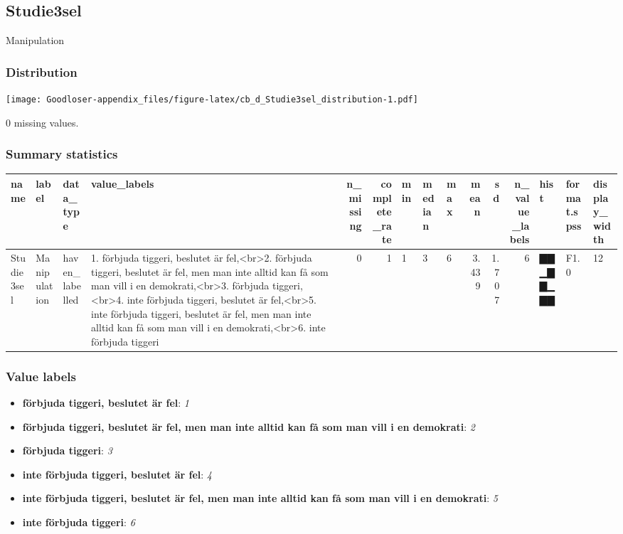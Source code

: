 \documentclass[
]{book}
\providecommand{\tightlist}{%
  \setlength{\itemsep}{0pt}\setlength{\parskip}{0pt}}
\begin{document}
\hypertarget{Studie3sel}{%
\subsection{Studie3sel}\label{Studie3sel}}

Manipulation

\hypertarget{Studie3sel_distribution}{%
\subsubsection{Distribution}\label{Studie3sel_distribution}}

\texttt{[image: Goodloser-appendix\_files/figure-latex/cb\_d\_Studie3sel\_distribution-1.pdf]}

0 missing values.

\hypertarget{Studie3sel_summary}{%
\subsubsection{Summary statistics}\label{Studie3sel_summary}}

\begin{tabular}{l|l|l|l|r|r|l|l|l|r|r|r|l|l|l}
\hline
name & label & data_type & value_labels & n_missing & complete_rate & min & median & max & mean & sd & n_value_labels & hist & format.spss & display_width\\
\hline
Studie3sel & Manipulation & haven_labelled & 1. förbjuda tiggeri, beslutet är fel,<br>2. förbjuda tiggeri, beslutet är fel, men man inte alltid kan få som man vill i en demokrati,<br>3. förbjuda tiggeri,<br>4. inte förbjuda tiggeri, beslutet är fel,<br>5. inte förbjuda tiggeri, beslutet är fel, men man inte alltid kan få som man vill i en demokrati,<br>6. inte förbjuda tiggeri & 0 & 1 & 1 & 3 & 6 & 3.439 & 1.707 & 6 & ▇▇▁▇▇▁▇▇ & F1.0 & 12\\
\hline
\end{tabular}

\hypertarget{Studie3sel_labels}{%
\subsubsection{Value labels}\label{Studie3sel_labels}}

\begin{itemize}
\tightlist
\item
  \textbf{förbjuda tiggeri, beslutet är fel}: \emph{1}
\item
  \textbf{förbjuda tiggeri, beslutet är fel, men man inte alltid kan få som man vill i en demokrati}: \emph{2}
\item
  \textbf{förbjuda tiggeri}: \emph{3}
\item
  \textbf{inte förbjuda tiggeri, beslutet är fel}: \emph{4}
\item
  \textbf{inte förbjuda tiggeri, beslutet är fel, men man inte alltid kan få som man vill i en demokrati}: \emph{5}
\item
  \textbf{inte förbjuda tiggeri}: \emph{6}
\end{itemize}
\end{document}

